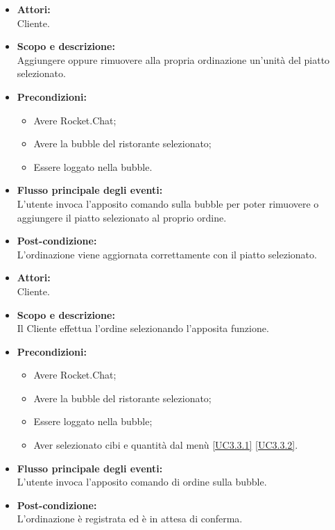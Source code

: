 
\begin{itemize}
	\item \textbf{Attori:}
	\\Cliente.
	\item \textbf{Scopo e descrizione:} 
	\\Aggiungere oppure rimuovere alla propria ordinazione un'unità del piatto selezionato.
	\item \textbf{Precondizioni:}
	\begin{itemize}
		\item Avere Rocket.Chat;
		\item Avere la bubble del ristorante selezionato;
		\item Essere loggato nella bubble.
	\end{itemize}
	\item \textbf{Flusso principale degli eventi:}
	\\L'utente invoca l'apposito comando sulla bubble per poter rimuovere o aggiungere il piatto selezionato al proprio ordine.
	\item \textbf{Post-condizione:}
	\\L'ordinazione viene aggiornata correttamente con il piatto selezionato.
\end{itemize}


\begin{itemize}
	\item \textbf{Attori:}
	\\Cliente.
	\item \textbf{Scopo e descrizione:} 
	\\Il Cliente effettua l'ordine selezionando l'apposita funzione.
	\item \textbf{Precondizioni:}
	\begin{itemize}
		\item Avere Rocket.Chat;
		\item Avere la bubble del ristorante selezionato;
		\item Essere loggato nella bubble;
		\item Aver selezionato cibi e quantità dal menù \ref{UC3.3.1} \ref{UC3.3.2}.
	\end{itemize}
	\item \textbf{Flusso principale degli eventi:}
	\\L'utente invoca l'apposito comando di ordine sulla bubble.
	\item \textbf{Post-condizione:}
	\\L'ordinazione è registrata ed è in attesa di conferma.
\end{itemize}

